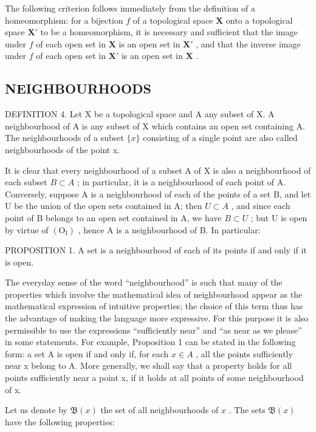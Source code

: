 The following criterion follows immediately from the definition of a homeomorphism: for a bijection \(f\) of a topological space \(\mathbf{X}\) onto a topological space \(\mathbf{X}'\) to be a homeomorphism, it is necessary and sufficient that the image under \(f\) of each open set in \(\mathbf{X}\) is an open set in \(\mathbf{X}'\) , and that the inverse image under \(f\) of each open set in \(\mathbf{X}'\) is an open set in \(\mathbf{X}\) .

\subsection{NEIGHBOURHOODS}

DEFINITION 4. Let X be a topological space and A any subset of X. A neighbourhood of A is any subset of X which contains an open set containing A. The neighbourhoods of a subset \(\{x\}\) consisting of a single point are also called neighbourhoods of the point x.

It is clear that every neighbourhood of a subset A of X is also a neighbourhood of each subset \(B \subset A\) ; in particular, it is a neighbourhood of each point of A. Conversely, suppose A is a neighbourhood of each of the points of a set B, and let U be the union of the open sets contained in A; then \(U \subset A\) , and since each point of B belongs to an open set contained in A, we have \(B \subset U\) ; but U is open by virtue of \((\mathrm{O}_{\mathrm{I}})\) , hence A is a neighbourhood of B. In particular:

PROPOSITION 1. A set is a neighbourhood of each of its points if and only if it is open.

The everyday sense of the word ``neighbourhood'' is such that many of the properties which involve the mathematical idea of neighbourhood appear as the mathematical expression of intuitive properties; the choice of this term thus has the advantage of making the language more expressive. For this purpose it is also permissible to use the expressions ``sufficiently near'' and ``as near as we please'' in some statements. For example, Proposition 1 can be stated in the following form: a set A is open if and only if, for each \(x \in A\) , all the points sufficiently near x belong to A. More generally, we shall say that a property holds for all points sufficiently near a point x, if it holds at all points of some neighbourhood of x.

Let us denote by \(\mathfrak{B}(x)\) the set of all neighbourhoods of \(x\) . The sets \(\mathfrak{B}(x)\) have the following properties:

